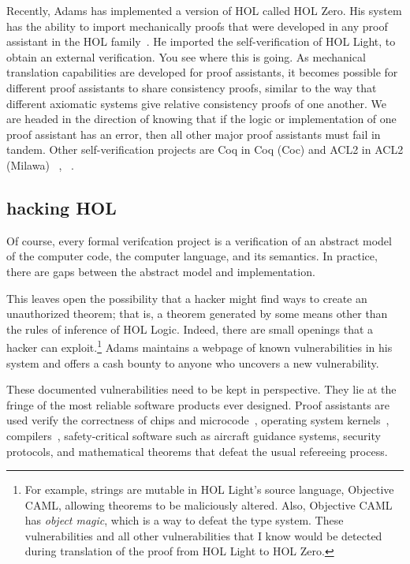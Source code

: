 \documentclass{llncs}
\begin{document}
Recently, Adams has implemented a version of HOL
called HOL Zero.  His system has the ability to  import mechanically
proofs that were developed in any proof assistant in the HOL
family~\cite{Adams}.  He imported the self-verification of HOL
Light, to obtain an external verification.  You see where
this is going.  As mechanical translation capabilities are developed
for proof assistants, it becomes possible for different proof
assistants to share consistency proofs, similar to the way that
different axiomatic systems give relative consistency proofs of one
another.  We are headed in the direction of knowing that if the logic
or implementation of one proof assistant has an error, then all other major
proof assistants must fail in tandem. Other self-verification projects
are Coq in Coq (Coc) and ACL2 in ACL2 (Milawa) ~\cite{Bar98}, ~\cite{Dav09}.

\subsection{hacking HOL}

Of course, every formal verifcation project is a verification of an
abstract model of the computer code, the computer language, and its
semantics.  In practice, there are gaps between the abstract
model and implementation.

  
This leaves open the possibility that a hacker might find ways to
create an unauthorized theorem; that is, a theorem generated by some
means other than the rules of inference of HOL Logic.  Indeed, there
are small openings that a hacker can exploit.\footnote{For example,
  strings are mutable in HOL Light's source language, Objective CAML, allowing
  theorems to be maliciously altered.  Also, Objective CAML has {\it
    object magic}, which is a way to defeat the type system.  These
  vulnerabilities and all other vulnerabilities that I know would be
  detected during translation of the proof from HOL Light to HOL
  Zero.}  Adams maintains a webpage of known vulnerabilities in his
system and offers a cash bounty to anyone who uncovers a new
vulnerability.

These documented vulnerabilities need to be kept in perspective.  They
lie at the fringe of the most reliable software products ever
designed. Proof assistants are used verify the correctness of chips
and microcode~\cite{FoxArm6}, operating system kernels~\cite{seL4}, 
compilers~\cite{CC}, safety-critical software such as aircraft
guidance systems, security protocols, and mathematical theorems that
defeat the usual refereeing process.  
\end{document}
